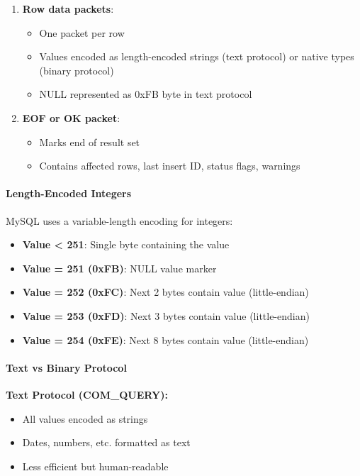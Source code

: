 \begin{enumerate}
    \item \textbf{Row data packets}:
    \begin{itemize}
        \item One packet per row
        \item Values encoded as length-encoded strings (text protocol) or native types (binary protocol)
        \item NULL represented as 0xFB byte in text protocol
    \end{itemize}
    
    \item \textbf{EOF or OK packet}:
    \begin{itemize}
        \item Marks end of result set
        \item Contains affected rows, last insert ID, status flags, warnings
    \end{itemize}
\end{enumerate}

\paragraph{Length-Encoded Integers}

MySQL uses a variable-length encoding for integers:

\begin{itemize}
    \item \textbf{Value < 251}: Single byte containing the value
    \item \textbf{Value = 251 (0xFB)}: NULL value marker
    \item \textbf{Value = 252 (0xFC)}: Next 2 bytes contain value (little-endian)
    \item \textbf{Value = 253 (0xFD)}: Next 3 bytes contain value (little-endian)
    \item \textbf{Value = 254 (0xFE)}: Next 8 bytes contain value (little-endian)
\end{itemize}

\paragraph{Text vs Binary Protocol}

\textbf{Text Protocol (COM\_QUERY):}
\begin{itemize}
    \item All values encoded as strings
    \item Dates, numbers, etc. formatted as text
    \item Less efficient but human-readable
\end{itemize}

